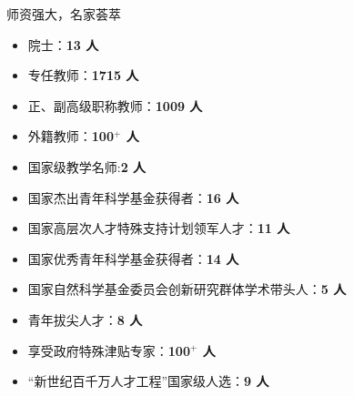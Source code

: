 \documentclass[aspectratio=169, utf8, fontset=windows]{beamer}
\begin{document}
\begin{frame}{师资强大，名家荟萃}
    \begin{multicols}{2}
        \begin{itemize}
            \item 院士：\textcolor{Fore}{\textbf{13 人}}
            \item 专任教师：\textcolor{Fore}{\textbf{1715 人}}
            \item 正、副高级职称教师：\textcolor{Fore}{\textbf{1009 人}}
            \item 外籍教师：\textcolor{Fore}{\textbf{100$^+$ 人}}
            \item 国家级教学名师:\textcolor{Fore}{\textbf{2 人}}
            \item 国家杰出青年科学基金获得者：\textcolor{Fore}{\textbf{16 人}}
            \item 国家高层次人才特殊支持计划领军人才：\textcolor{Fore}{\textbf{11 人}}
            \item 国家优秀青年科学基金获得者：\textcolor{Fore}{\textbf{14 人}}
            \item 国家自然科学基金委员会创新研究群体学术带头人：\textcolor{Fore}{\textbf{5 人}}
            \item 青年拔尖人才：\textcolor{Fore}{\textbf{8 人}}
            \item 享受政府特殊津贴专家：\textcolor{Fore}{\textbf{100$^+$ 人}}
            \item “新世纪百千万人才工程”国家级人选：\textcolor{Fore}{\textbf{9 人}}
        \end{itemize}
    \end{multicols}
\end{frame}
\end{document}
